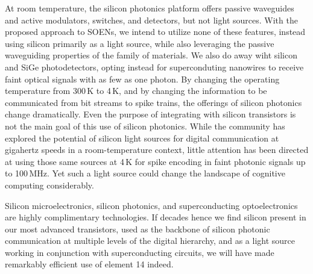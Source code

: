 \vspace{3em}
At room temperature, the silicon photonics platform offers passive waveguides and active modulators, switches, and detectors, but not light sources. With the proposed approach to SOENs, we intend to utilize none of these features, instead using silicon primarily as a light source, while also leveraging the passive waveguiding properties of the family of materials. We also do away wiht silicon and SiGe photodetectors, opting instead for superconduting nanowires to receive faint optical signals with as few as one photon. By changing the operating temperature from 300\,K to 4\,K, and by changing the information to be communicated from bit streams to spike trains, the offerings of silicon photonics change dramatically. Even the purpose of integrating with silicon transistors is not the main goal of this use of silicon photonics. While the community has explored the potential of silicon light sources for digital communication at gigahertz speeds in a room-temperature context, little attention has been directed at using those same sources at 4\,K for spike encoding in faint photonic signals up to 100\,MHz. Yet such a light source could change the landscape of cognitive computing considerably. 

Silicon microelectronics, silicon photonics, and superconducting optoelectronics are highly complimentary technologies. If decades hence we find silicon present in our most advanced transistors, used as the backbone of silicon photonic communication at multiple levels of the digital hierarchy, and as a light source working in conjunction with superconducting circuits, we will have made remarkably efficient use of element 14 indeed.

